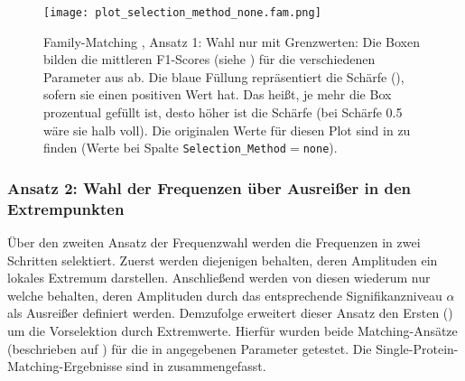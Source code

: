             \begin{figure}[H]
                \texttt{[image: plot\_selection\_method\_none.fam.png]}
                \caption[Family-Matching , Ansatz 1: Wahl nur mit Grenzwerten]{Family-Matching , Ansatz 1: Wahl nur mit Grenzwerten: Die Boxen bilden die mittleren F1-Scores (siehe ) für die verschiedenen Parameter aus  ab. Die blaue Füllung repräsentiert die Schärfe (), sofern sie einen positiven Wert hat. Das heißt, je mehr die Box prozentual gefüllt ist, desto höher ist die Schärfe (bei Schärfe 0.5 wäre sie halb voll). Die originalen Werte für diesen Plot sind in  zu finden (Werte bei Spalte \texttt{Selection\_Method}$=$\texttt{none}).}
                \label{fig:selection_method.none.fam}
            \end{figure}

        \subsubsection{Ansatz 2: Wahl der Frequenzen über Ausreißer in den Extrempunkten} %
        \label{ssub:ansatz_2_results}
        Über den zweiten Ansatz der Frequenzwahl werden die Frequenzen in zwei Schritten selektiert. Zuerst werden diejenigen behalten, deren Amplituden ein lokales Extremum darstellen. Anschließend werden von diesen wiederum nur welche behalten, deren Amplituden durch das entsprechende Signifikanzniveau $\alpha$ als Ausreißer definiert werden. Demzufolge erweitert dieser Ansatz den Ersten () um die Vorselektion durch Extremwerte. Hierfür wurden beide Matching-Ansätze (beschrieben auf ) für die in  angegebenen Parameter getestet. Die Single-Protein-Matching-Ergebnisse sind in  zusammengefasst.
        
